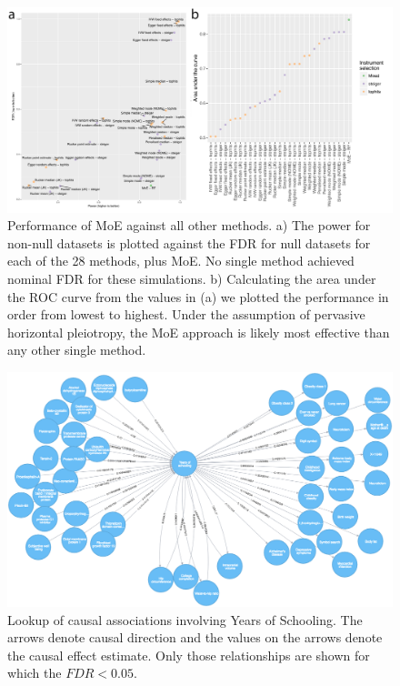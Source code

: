 \documentclass[]{article}
\begin{document}
\begin{figure}
\centering
\includegraphics{images/fig3.pdf}
\caption{Performance of MoE against all other methods. a) The power for
non-null datasets is plotted against the FDR for null datasets for each
of the 28 methods, plus MoE. No single method achieved nominal FDR for
these simulations. b) Calculating the area under the ROC curve from the
values in (a) we plotted the performance in order from lowest to
highest. Under the assumption of pervasive horizontal pleiotropy, the
MoE approach is likely most effective than any other single method.}
\end{figure}

\newpage

\begin{figure}
\centering
\includegraphics{images/fig4.png}
\caption{Lookup of causal associations involving Years of Schooling. The
arrows denote causal direction and the values on the arrows denote the
causal effect estimate. Only those relationships are shown for which the
\(FDR < 0.05\).}
\end{figure}
\end{document}
